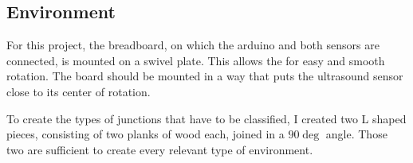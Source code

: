 \subsection{Environment}
\label{subsec:environment}

For this project, the breadboard, on which the arduino and both sensors are connected, is mounted on a swivel plate.
This allows the for easy and smooth rotation.
The board should be mounted in a way that puts the ultrasound sensor close to its center of rotation.

To create the types of junctions that have to be classified, I created two L shaped pieces, consisting of two planks of wood each, joined in a $90\deg$ angle.
Those two are sufficient to create every relevant type of environment.

